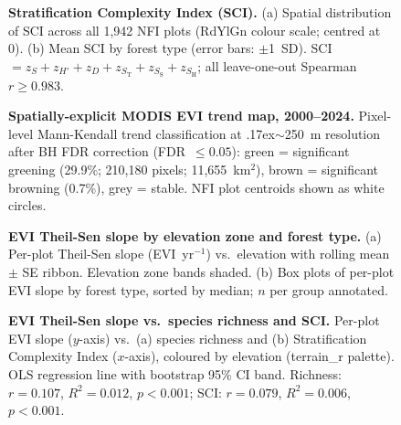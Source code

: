 \documentclass[review,12pt,a4paper]{elsarticle}
\begin{document}
\begin{figure}[htbp]
  \centering
  \caption{\textbf{Stratification Complexity Index (SCI).}
    (a) Spatial distribution of SCI across all 1{,}942 NFI plots
    (RdYlGn colour scale; centred at 0). (b) Mean SCI by forest type
    (error bars: $\pm$1~SD). SCI $= z_S + z_{H'} + z_D +
    z_{S_\text{T}} + z_{S_\text{S}} + z_{S_\text{H}}$;
    all leave-one-out Spearman $r \geq 0.983$.}
  \label{fig:sci}
\end{figure}

\begin{figure}[htbp]
  \centering
  \caption{\textbf{Spatially-explicit MODIS EVI trend map, 2000--2024.}
    Pixel-level Mann-Kendall trend classification at {\raise.17ex\hbox{$\scriptstyle\sim$}}250~m resolution
    after BH FDR correction (FDR~$\leq 0.05$): green = significant
    greening (29.9\%; 210{,}180 pixels; 11{,}655~km$^2$), brown =
    significant browning (0.7\%), grey = stable. NFI plot centroids
    shown as white circles.}
  \label{fig:evimap}
\end{figure}

\begin{figure}[htbp]
  \centering
  \caption{\textbf{EVI Theil-Sen slope by elevation zone and forest type.}
    (a) Per-plot Theil-Sen slope (EVI~yr$^{-1}$) vs.\ elevation with
    rolling mean $\pm$ SE ribbon. Elevation zone bands shaded.
    (b) Box plots of per-plot EVI slope by forest type, sorted by median;
    $n$ per group annotated.}
  \label{fig:evigrad}
\end{figure}

\begin{figure}[htbp]
  \centering
  \caption{\textbf{EVI Theil-Sen slope vs.\ species richness and SCI.}
    Per-plot EVI slope ($y$-axis) vs.\ (a) species richness and
    (b) Stratification Complexity Index ($x$-axis), coloured by elevation
    (terrain\_r palette). OLS regression line with bootstrap 95\% CI band.
    Richness: $r = 0.107$, $R^2 = 0.012$, $p < 0.001$;
    SCI: $r = 0.079$, $R^2 = 0.006$, $p < 0.001$.}
  \label{fig:eviscatter}
\end{figure}




\end{document}
